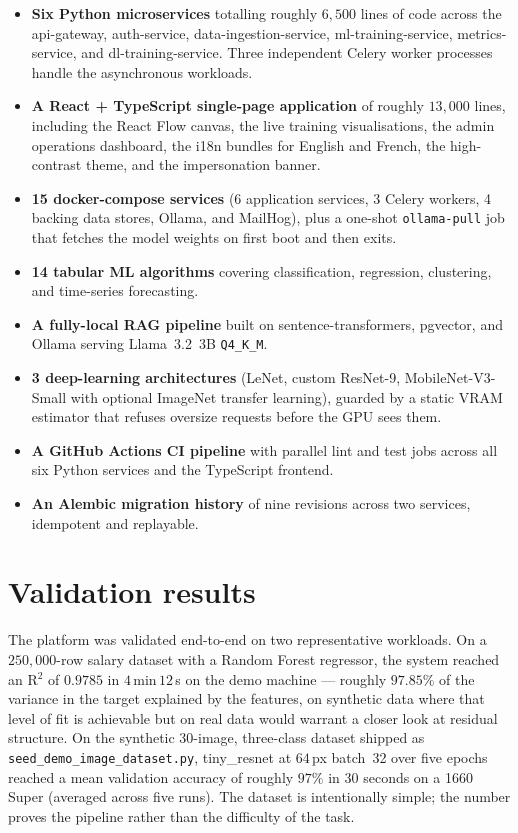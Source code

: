 \documentclass[12pt, a4paper, oneside]{report}
\begin{document}
\begin{itemize}
    \item \textbf{Six Python microservices} totalling roughly
        $6{,}500$ lines of code across the api-gateway,
        auth-service, data-ingestion-service, ml-training-service,
        metrics-service, and dl-training-service. Three independent
        Celery worker processes handle the asynchronous workloads.
    \item \textbf{A React + TypeScript single-page application} of
        roughly $13{,}000$ lines, including the React Flow canvas,
        the live training visualisations, the admin operations
        dashboard, the i18n bundles for English and French, the
        high-contrast theme, and the impersonation banner.
    \item \textbf{15 docker-compose services} (6 application
        services, 3 Celery workers, 4 backing data stores, Ollama, and
        MailHog), plus a one-shot \texttt{ollama-pull} job that fetches
        the model weights on first boot and then exits.
    \item \textbf{14 tabular ML algorithms} covering classification,
        regression, clustering, and time-series forecasting.
    \item \textbf{A fully-local RAG pipeline} built on
        sentence-transformers, pgvector, and Ollama serving
        Llama~3.2~3B \texttt{Q4\_K\_M}.
    \item \textbf{3 deep-learning architectures} (LeNet, custom
        ResNet-9, MobileNet-V3-Small with optional ImageNet transfer
        learning), guarded by a static VRAM estimator that refuses
        oversize requests before the GPU sees them.
    \item \textbf{A GitHub Actions CI pipeline} with parallel lint
        and test jobs across all six Python services and the
        TypeScript frontend.
    \item \textbf{An Alembic migration history} of nine revisions
        across two services, idempotent and replayable.
\end{itemize}

\section*{Validation results}

The platform was validated end-to-end on two representative
workloads. On a $250{,}000$-row salary dataset with a Random Forest
regressor, the system reached an R$^2$ of $0.9785$ in
$4$\,min\,$12$\,s on the demo machine --- roughly $97.85\%$ of the
variance in the target explained by the features, on synthetic data
where that level of fit is achievable but on real data would warrant
a closer look at residual structure. On the synthetic 30-image,
three-class dataset shipped as \texttt{seed\_demo\_image\_dataset.py},
tiny\_resnet at $64$\,px batch~32 over five epochs reached a mean
validation accuracy of roughly $97\%$ in $30$ seconds on a 1660
Super (averaged across five runs). The dataset is intentionally
simple; the number proves the pipeline rather than the difficulty
of the task.
\end{document}
